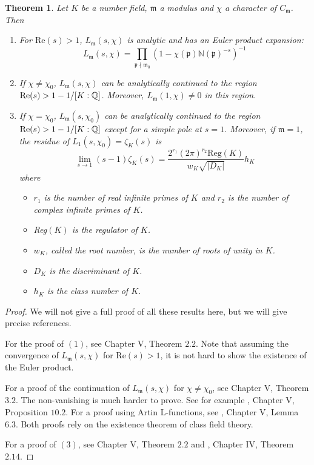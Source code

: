 \documentclass[]{amsart}
\newtheorem{theorem}{Theorem}
\newcommand{\Q}{\mathbb{Q}}
\newcommand{\m}{\mathfrak{m}}
\newcommand{\N}{\mathbb{N}}
\newcommand{\Lms}{L_\mathfrak{m}(s,\chi)}
\newcommand{\p}{\mathfrak{p}}
\begin{document}
	\begin{theorem}\label{thm:Lseries}
		Let $K$ be a number field, $\m$ a modulus and $\chi$ a character of $C_\m$. Then
		\begin{enumerate}
			\item For $\text{Re}(s)>1$, $\Lms$ is analytic and has an Euler product expansion:
			\[\Lms=\prod_{\p\nmid\m_0}(1-\chi(\p)\N(\p)^{-s})^{-1}\]
			
			\item If $\chi\neq\chi_0$, $\Lms$ can be analytically continued to the region $\text{Re}(s)>1-1/[K:\nolinebreak[4]\Q]$. Moreover, $L_\m(1,\chi)\neq 0$ in this region.
			
			\item If $\chi=\chi_0$, $L_\m(s,\chi_0)$ can be analytically continued to the region $\text{Re}(s)>1-1/[K:\nolinebreak[4]\Q]$ except for a simple pole at $s=1$. Moreover, if $\m=1$, the residue of $L_1(s,\chi_0)=\zeta_K(s)$ is
			\[\lim_{s\rightarrow 1}(s-1)\zeta_K(s)=\frac{2^{r_1}(2\pi)^{r_2}\text{Reg}(K)}{w_K\sqrt{|D_K|}}h_K\]
			where
			\begin{itemize}
				\item $r_1$ is the number of real infinite primes of $K$ and $r_2$ is the number of complex infinite primes of $K$.
				\item Reg$(K)$ is the regulator of $K$.
				\item $w_K$, called the root number, is the number of roots of unity in $K$.
				\item $D_K$ is the discriminant of $K$.
				\item $h_K$ is the class number of $K$. 
			\end{itemize}						
		\end{enumerate}
	\end{theorem}
		\begin{proof}
			We will not give a full proof of all these results here, but we will give precise references.
			
			For the proof of $(1)$, see \cite{Neu} Chapter V, Theorem $2.2$. Note that assuming the convergence of $\Lms$ for $\text{Re}(s)>1$, it is not hard to show the existence of the Euler product. 
			
			For a proof of the continuation of $\Lms$ for $\chi\neq\chi_0$, see \cite{Neu} Chapter V, Theorem $3.2$. The non-vanishing is much harder to prove. See for example \cite{Jan}, Chapter V, Proposition $10.2$. For a proof using Artin L-functions, see \cite{Neu}, Chapter V, Lemma $6.3$. Both proofs rely on the existence theorem of class field theory.
			
			For a proof of $(3)$, see \cite{Neu} Chapter V, Theorem $2.2$ and \cite{Jan}, Chapter IV, Theorem $2.14$.			
		\end{proof}
		
\end{document}
